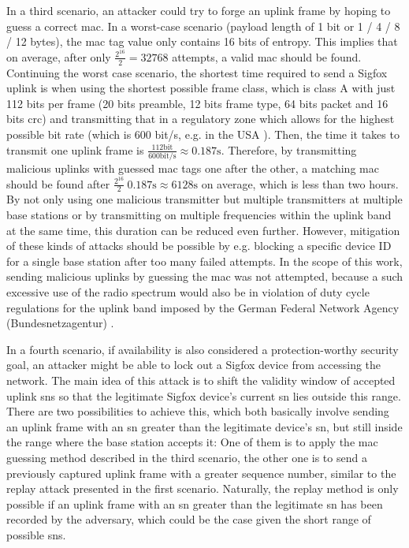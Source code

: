 In a third scenario, an attacker could try to forge an uplink frame by hoping to guess a correct \gls{mac}.
In a worst-case scenario (payload length of 1 bit or 1 / 4 / 8 / 12 bytes), the \gls{mac} tag value only contains 16 bits of entropy.
This implies that on average, after only $\frac{2^{16}}{2} = 32768$ attempts, a valid \gls{mac} should be found.
Continuing the worst case scenario, the shortest time required to send a Sigfox uplink is when using the shortest possible frame class, which is class A with just 112 bits per frame (20 bits preamble, 12 bits frame type, 64 bits packet and 16 bits \gls{crc}) and transmitting that in a regulatory zone which allows for the highest possible bit rate (which is 600 bit/s, e.g. in the USA \cite{sigfox_ietf}).
Then, the time it takes to transmit one uplink frame is $\frac{112 \mathrm{bit}}{600 \mathrm{bit}/\mathrm{s}} \approx 0.187 \mathrm{s}$.
Therefore, by transmitting malicious uplinks with guessed \gls{mac} tags one after the other, a matching \gls{mac} should be found after $\frac{2^{16}}{2} ~ 0.187 \mathrm{s} \approx 6128 \mathrm{s}$ on average, which is less than two hours.
By not only using one malicious transmitter but multiple transmitters at multiple base stations or by transmitting on multiple frequencies within the uplink band at the same time, this duration can be reduced even further.
However, mitigation of these kinds of attacks should be possible by e.g. blocking a specific device ID for a single base station after too many failed attempts.
In the scope of this work, sending malicious uplinks by guessing the \gls{mac} was not attempted, because a such excessive use of the radio spectrum would also be in violation of duty cycle regulations for the uplink band imposed by the German Federal Network Agency (Bundesnetzagentur) \cite[page 3]{bnetza_srd}.

In a fourth scenario, if availability is also considered a protection-worthy security goal, an attacker might be able to lock out a Sigfox device from accessing the network.
The main idea of this attack is to shift the validity window of accepted uplink \glspl{sn} so that the legitimate Sigfox device's current \gls{sn} lies outside this range.
There are two possibilities to achieve this, which both basically involve sending an uplink frame with an \gls{sn} greater than the legitimate device's \gls{sn}, but still inside the range where the base station accepts it:
One of them is to apply the \gls{mac} guessing method described in the third scenario, the other one is to send a previously captured uplink frame with a greater sequence number, similar to the replay attack presented in the first scenario.
Naturally, the replay method is only possible if an uplink frame with an \gls{sn} greater than the legitimate \gls{sn} has been recorded by the adversary, which could be the case given the short range of possible \glspl{sn}.


